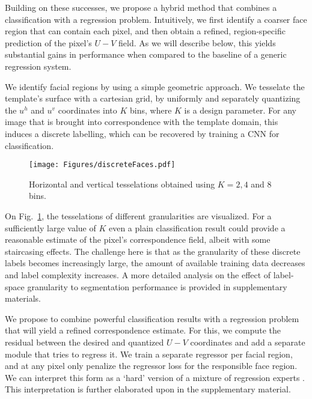 \documentclass[10pt,twocolumn,letterpaper]{article}
\begin{document}
	Building on these successes, we propose a hybrid method that combines a classification with a regression problem. Intuitively, we first identify a coarser face region that can contain each pixel, and then obtain a refined, region-specific prediction of the pixel's $U-V$  field. As we will describe below, this yields substantial gains in performance when compared to the baseline of a generic regression system. 
	
	We identify  facial regions  by using a simple geometric approach.
	We tesselate the template's surface with a cartesian grid, by uniformly and separately quantizing the $u^h$ and $u^v$ coordinates into $K$ bins, where $K$ is a design parameter. For any image that is brought into correspondence with the template domain, this induces a discrete labelling, which can be recovered by training a  CNN for classification.
	
\begin{figure}[b]
\begin{center}
   \texttt{[image: Figures/discreteFaces.pdf]}
\end{center}
   \caption{Horizontal and vertical tesselations obtained using $K=2,4$ and $8$ bins.}
   \vspace{-0.5cm}
\label{fig:DiscreteFaces}
\end{figure}

	 On Fig.~\ref{fig:DiscreteFaces}, the tesselations of different granularities are visualized. For a sufficiently large value of $K$ even a plain classification result could provide a reasonable estimate of the pixel's correspondence field, albeit with some staircasing effects. The challenge here is that as the granularity of these discrete labels becomes increasingly large, the amount of available training data decreases and label complexity increases. A more detailed analysis on the effect of label-space granularity to segmentation performance is provided in supplementary materials.
	
	We propose to combine powerful classification results with a regression problem that will yield a  refined  correspondence estimate. For this, we compute the residual between the desired and quantized $U-V$  coordinates and add a separate module that tries to regress it. We train a separate regressor per facial region, and at any pixel only penalize the regressor loss for the responsible face region. We can interpret this form as a `hard' version of a mixture of regression experts \cite{JordanJ94}. This interpretation is further elaborated upon in the supplementary material.
	
\end{document}
